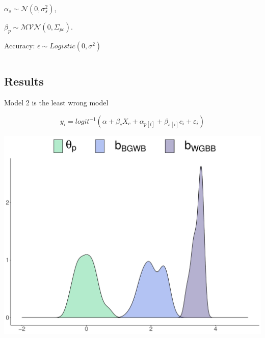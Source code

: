 \documentclass[compress]{beamer}
\begin{document}
\begin{frame}
	\begin{centering}
		$\alpha_s \sim \mathcal{N}(0, \sigma_s^2)$,
		
	\end{centering}
	
	\begin{centering}
		
		$\beta_p \sim \mathcal{MVN}(0, \Sigma_{pc})$.
		
	\end{centering}
	
	
	\vspace{1.5mm}
	
	\footnotesize{Accuracy: $\epsilon \sim Logistic (0, \sigma^2)$}
	
		\vspace{1.5mm}
\pause
\begin{columns}[T]
	\begin{column}{.50\linewidth}
		\centering
		
		
	\end{column}
		\begin{column}{.50\linewidth}
				\centering
	
	\end{column}
\end{columns}
\end{frame}

\subsection{Results}

\begin{frame}{Model 2 is the least wrong model}
	
		\begin{equation*}\label{Accuracy5}
		y_{i} = logit^{-1}(\alpha + \beta_c X_c +  \alpha_{p[i]} +  \beta_{s[i]}c_{i} + \varepsilon_{i})
	\end{equation*}
	
	\centering
	\includegraphics[width=0.6\linewidth]{img/raceParaccuracy.pdf}
\end{frame}
\end{document}
